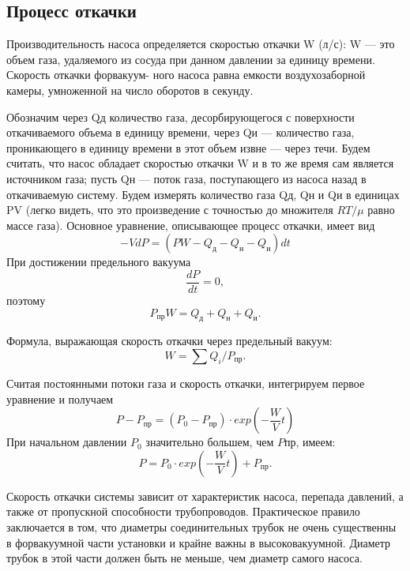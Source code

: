 \documentclass[12pt,a4paper]{article}
\begin{document}
\subsection{Процесс откачки}
Производительность насоса определяется скоростью откачки W (л/с): W — это объем газа, удаляемого из сосуда при
данном давлении за единицу времени. Скорость откачки форвакуум-
ного насоса равна емкости воздухозаборной камеры, умноженной на
число оборотов в секунду. \par
Обозначим через Qд количество газа, десорбирующегося с поверхности откачиваемого объема в единицу времени, через Qи — количество газа, проникающего в единицу времени в этот объем извне — через течи. Будем считать, что насос обладает скоростью откачки W и в то же время сам является источником газа; пусть Qн — поток газа, поступающего из насоса
назад в откачиваемую систему. Будем измерять количество газа Qд, Qн и Qи в единицах PV (легко видеть, что это произведение с точностью до множителя $RT/\mu$ равно массе газа). Основное уравнение, описывающее процесс откачки, имеет вид
\begin{equation}
−VdP = (PW - Q_д - Q_н - Q_и)dt
\end{equation}
При достижении предельного вакуума 
\begin{equation}
\frac{dP}{dt}=0,
\end{equation}
поэтому
\begin{equation}
P_{пр}W =Q_д + Q_н + Q_и.
\end{equation}

Формула, выражающая скорость откачки через предельный вакуум:
	\begin{equation}
W = \sum Q_i / P_{пр}.
	\end{equation}

Считая постоянными потоки газа и скорость откачки, интегрируем первое уравнение и получаем
\begin{equation}
P - P_{пр}= (P_0 - P_{пр}) \cdot exp(-\frac{W}{V}t)
\end{equation}
При начальном давлении $P_0$ значительно большем, чем $P$пр, имеем:
\begin{equation}
P = P_0 \cdot exp(-\frac{W}{V}t) + P_{пр}.
\label{eq:p}
\end{equation}

Скорость откачки системы зависит от характеристик насоса, перепада давлений, а также от пропускной способности трубопроводов. Практическое правило заключается в том, что диаметры соединительных трубок не очень существенны в форвакуумной части установки и крайне важны в высоковакуумной. Диаметр трубок в этой части должен быть не меньше, чем диаметр самого насоса.
\end{document}
